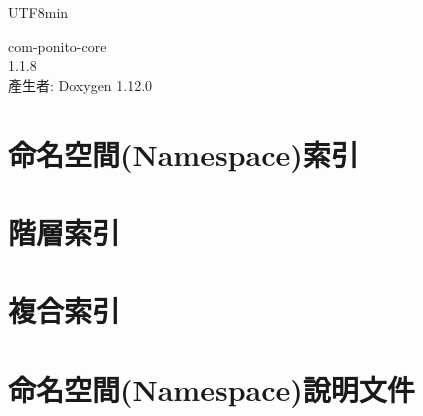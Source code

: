 \documentclass[twoside]{book}
\newcommand{\+}{\discretionary{\mbox{\scriptsize$\hookleftarrow$}}{}{}}
\newcommand{\clearemptydoublepage}{%
    \newpage{\pagestyle{empty}\cleardoublepage}%
  }
\begin{document}
  \raggedbottom
  \begin{CJK}{UTF8}{min}
    \hypersetup{pageanchor=false,
                bookmarksnumbered=true,
                pdfencoding=unicode
               }
  \begin{titlepage}
  \vspace*{7cm}
  \begin{center}%
  {\Large com-\/ponito-\/core}\\
  [1ex]\large 1.\+1.\+8 \\
  \vspace*{1cm}
  {\large 產生者\+: Doxygen 1.12.0}\\
  \end{center}
  \end{titlepage}
  \clearemptydoublepage
  \tableofcontents
  \clearemptydoublepage
  \hypersetup{pageanchor=true}



\chapter{命名空間(Namespace)索引}

\chapter{階層索引}

\chapter{複合索引}

\chapter{命名空間(Namespace)說明文件}




























\end{CJK}
\end{document}
